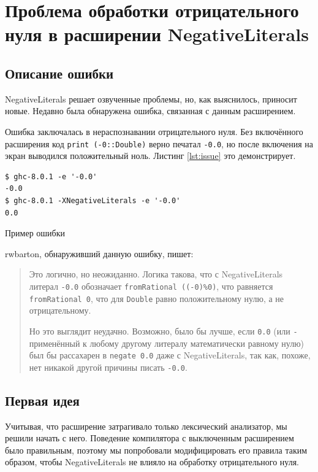 \section[Проблема в расширении NegativeLiterals]
{Проблема обработки отрицательного нуля в расширении NegativeLiterals}

\subsection{Описание ошибки}

NegativeLiterals решает озвученные проблемы, но, как выяснилось, приносит
новые. Недавно была обнаружена ошибка, связанная с данным расширением.
\cite{trac}

Ошибка заключалась в нераспознавании отрицательного нуля. Без включённого
расширения код \texttt{print (-0::Double)} верно печатал \texttt{-0.0}, но
после включения на экран выводился положительный ноль. Листинг \ref{lst:issue}
это демонстрирует.

\begin{ListingEnv}[H]
\begin{verbatim}
$ ghc-8.0.1 -e '-0.0'
-0.0
$ ghc-8.0.1 -XNegativeLiterals -e '-0.0'
0.0
\end{verbatim}
\caption{Пример ошибки}
\label{lst:issue}
\end{ListingEnv}

rwbarton, обнаруживший данную ошибку, пишет:

\begin{quotation}
Это логично, но неожиданно. Логика такова, что с NegativeLiterals литерал
\texttt{-0.0} обозначает \texttt{fromRational ((-0)\%0)}, что равняется
\texttt{fromRational 0}, что для \texttt{Double} равно положительному нулю,
а не отрицательному.

Но это выглядит неудачно. Возможно, было бы лучше, если \texttt{0.0} (или
\texttt{-} применённый к любому другому литералу математически равному нулю)
был бы рассахарен в \texttt{negate 0.0} даже с NegativeLiterals, так как,
похоже, нет никакой другой причины писать \texttt{-0.0}.
\end{quotation}

\subsection{Первая идея}

Учитывая, что расширение затрагивало только лексический анализатор, мы решили
начать с него. Поведение компилятора с выключенным расширением было правильным,
поэтому мы попробовали модифицировать его правила таким образом, чтобы
NegativeLiterals не влияло на обработку отрицательного нуля.

